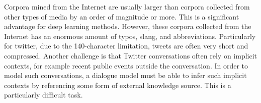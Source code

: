 \documentclass[bsc,frontabs,twoside,singlespacing,parskip,deptreport]{infthesis}     %
\begin{document}
Corpora mined from the Internet are usually larger than corpora collected from other types of media by an order of magnitude or more. This is a significant advantage for deep learning methods. However, these corpora collected from the Internet has an enormous amount of typos, slang, and abbreviations. Particularly for twitter, due to the 140-character limitation, tweets are often very short and compressed\cite{serban2018survey}. Another challenge is that Twitter conversations often rely on implicit contexts, for example recent public events outside the conversation. In order to model such conversations, a dialogue model must be able to infer such implicit contexts by referencing some form of external knowledge source. This is a particularly difficult task.

\end{document}
